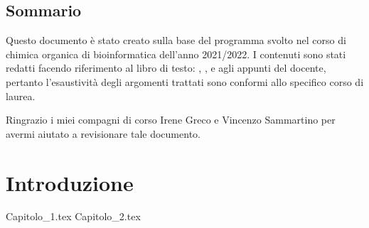 \documentclass[a4paper,12pt,oneside]{book} %
\begin{document}
\frontmatter




\chapter*{Sommario}
Questo documento è stato creato sulla base del programma svolto nel corso di chimica organica di bioinformatica dell'anno 2021/2022. I contenuti sono stati redatti facendo riferimento al libro di testo: \cite{brown2014introduzione}, \cite{hart2008chimica}, \cite{pianetaChimica}  e agli appunti del docente, pertanto l'esaustività degli argomenti trattati sono conformi allo specifico corso di laurea.

Ringrazio i miei compagni di corso Irene Greco e Vincenzo Sammartino per avermi aiutato a revisionare tale documento.


\begingroup
{}
\hypersetup{hidelinks} %
\fancyhead[LO]{ }
\tableofcontents %

\listofreactions %

\listoffigures %
\fancyhead[LO]{\textsc{\leftmark}}
\listoftables %
\thispagestyle{empty}
\endgroup

\mainmatter


\part{Introduzione}
{Capitolo_1.tex} %
{Capitolo_2.tex} %

\end{document}
